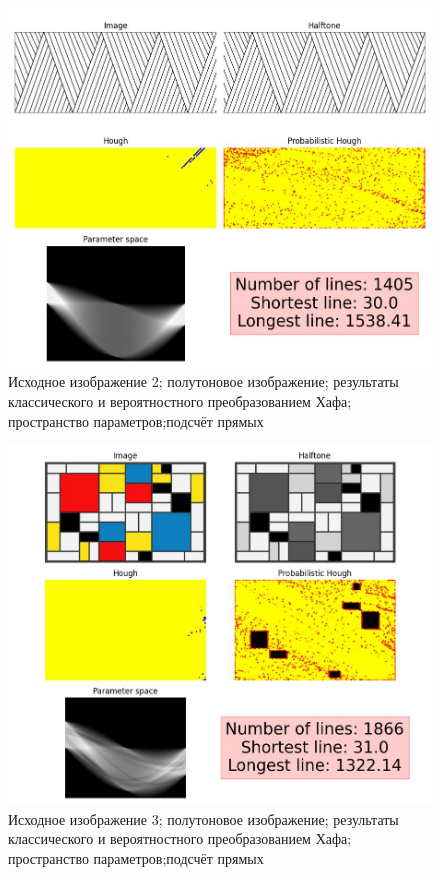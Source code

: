 \begin{figure}[ht!]
    \centering
    \includegraphics[width=\textwidth]{images/lines/simple_lines_gray.jpg}
    \caption{Исходное изображение 2; полутоновое изображение; результаты классического и вероятностного преобразованием Хафа; пространство параметров;подсчёт прямых}
    \label{img:fin_fir_gray}
\end{figure}

\begin{figure}[ht!]
    \centering
    \includegraphics[width=\textwidth]{images/lines/Mondrian_03_gray.jpg}
    \caption{Исходное изображение 3; полутоновое изображение; результаты классического и вероятностного преобразованием Хафа; пространство параметров;подсчёт прямых}
    \label{img:fin_piet_gray}
\end{figure}

\clearpage